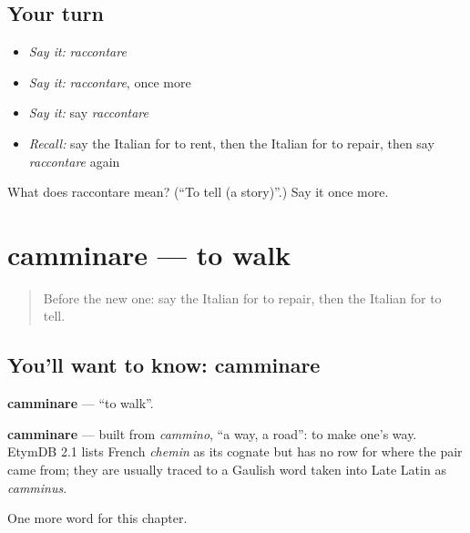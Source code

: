 \subsection*{Your turn}
\begin{itemize}
\raggedright
  \item \emph{Say it:} \emph{raccontare}
  \item \emph{Say it:} \emph{raccontare}, once more
  \item \emph{Say it:} say \emph{raccontare}
  \item \emph{Recall:} say the Italian for to rent, then the Italian for to repair, then say \emph{raccontare} again
\end{itemize}

\begin{tcolorbox}[breakable,colback=teal!4,colframe=teal!35!black,title={Before you move on}]
What does raccontare mean? (\textquotedblleft{}To tell (a story)\textquotedblright{}.) Say it once more.
\end{tcolorbox}
\section[camminare]{camminare — to walk}

\label{lesson:IT-C136-camminare}



\begin{quote}
Before the new one: say the Italian for to repair, then the Italian for to tell.
\end{quote}

\subsection*{You'll want to know: camminare}
\textbf{camminare} — \textquotedblleft{}to walk\textquotedblright{}.

\begin{cousinweb}
\textbf{camminare} — built from \emph{cammino}, \textquotedblleft{}a way, a road\textquotedblright{}: to make one's way. EtymDB 2.1 lists French \emph{chemin} as its cognate but has no row for where the pair came from; they are usually traced to a Gaulish word taken into Late Latin as \emph{camminus}.
\end{cousinweb}

\begin{grammarlens}[title={What you've built}]
One more word for this chapter.
\end{grammarlens}


